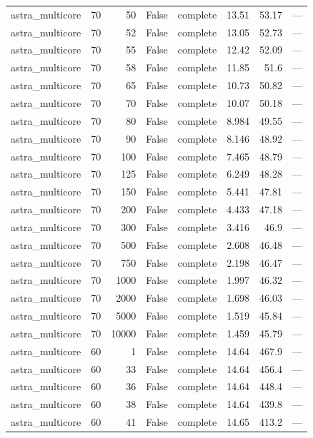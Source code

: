 \begin{tabular}{lrrrlrrl}
astra\_multicore & 70 & 50 & False & complete & 13.51 & 53.17 & — \\
astra\_multicore & 70 & 52 & False & complete & 13.05 & 52.73 & — \\
astra\_multicore & 70 & 55 & False & complete & 12.42 & 52.09 & — \\
astra\_multicore & 70 & 58 & False & complete & 11.85 & 51.6 & — \\
astra\_multicore & 70 & 65 & False & complete & 10.73 & 50.82 & — \\
astra\_multicore & 70 & 70 & False & complete & 10.07 & 50.18 & — \\
astra\_multicore & 70 & 80 & False & complete & 8.984 & 49.55 & — \\
astra\_multicore & 70 & 90 & False & complete & 8.146 & 48.92 & — \\
astra\_multicore & 70 & 100 & False & complete & 7.465 & 48.79 & — \\
astra\_multicore & 70 & 125 & False & complete & 6.249 & 48.28 & — \\
astra\_multicore & 70 & 150 & False & complete & 5.441 & 47.81 & — \\
astra\_multicore & 70 & 200 & False & complete & 4.433 & 47.18 & — \\
astra\_multicore & 70 & 300 & False & complete & 3.416 & 46.9 & — \\
astra\_multicore & 70 & 500 & False & complete & 2.608 & 46.48 & — \\
astra\_multicore & 70 & 750 & False & complete & 2.198 & 46.47 & — \\
astra\_multicore & 70 & 1000 & False & complete & 1.997 & 46.32 & — \\
astra\_multicore & 70 & 2000 & False & complete & 1.698 & 46.03 & — \\
astra\_multicore & 70 & 5000 & False & complete & 1.519 & 45.84 & — \\
astra\_multicore & 70 & 10000 & False & complete & 1.459 & 45.79 & — \\
astra\_multicore & 60 & 1 & False & complete & 14.64 & 467.9 & — \\
astra\_multicore & 60 & 33 & False & complete & 14.64 & 456.4 & — \\
astra\_multicore & 60 & 36 & False & complete & 14.64 & 448.4 & — \\
astra\_multicore & 60 & 38 & False & complete & 14.64 & 439.8 & — \\
astra\_multicore & 60 & 41 & False & complete & 14.65 & 413.2 & — \\

\end{tabular}
